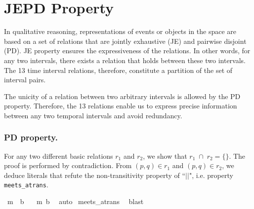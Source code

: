 \documentclass{llncs}
\begin{document}


\section{JEPD Property}
\label{sect:jepd}
In qualitative reasoning, representations of events or objects in the space are based on a set of relations that are jointly exhaustive (JE) and pairwise disjoint (PD). JE property ensures the expressiveness of the relations.  
In other words, for any two intervals, there exists a relation that holds between these two intervals. The 13 time interval relations, therefore, constitute a partition of the set of interval pairs. %

The unicity of a relation between two arbitrary intervals is allowed by the PD property.  Therefore, the 13 relations enable us to express precise information between any two temporal intervals and avoid redundancy. 

\subsubsection{PD property.} 
For any two different basic relations $r_1$ and $r_2$, we show that $r_1\; \cap\; r_2 = \{\}$. The proof is performed by contradiction. From $(p,q) \in r_1$ and $(p,q) \in r_2$, we deduce literals that refute the non-transitivity property of ``$||$", i.e. property \texttt{meets\_atrans}. %
\begin{isabellebody}
\isanewline
{}\isamarkupfalse%
\ {\isachardoublequoteopen}m\ {\isasyminter}\ b\ {\isacharequal}\ {\isacharbraceleft}{\isacharbraceright}{\isachardoublequoteclose}\isanewline
%
%
%
{}\isamarkupfalse%
\ m\ b\ \isamarkupfalse%
\ auto\isanewline
{}\isamarkupfalse%
\ meets\_atrans\ \isamarkupfalse%
\ blast%
\isanewline
{\isafoldproof}%
%
\end{isabellebody}
\end{document}
